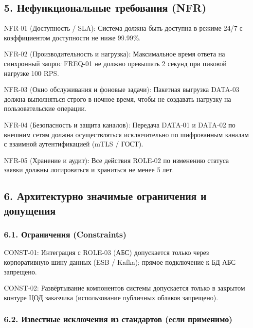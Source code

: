\documentclass[10pt,a4paper]{article}
\begin{document}
\subsection{5. Нефункциональные требования (NFR)}\label{5-ux43dux435ux444ux443ux43dux43aux446ux438ux43eux43dux430ux43bux44cux43dux44bux435-ux442ux440ux435ux431ux43eux432ux430ux43dux438ux44f-nfr}

NFR-01 (Доступность / SLA): Система должна быть доступна в режиме 24/7 с коэффициентом доступности не ниже 99.99\%.

NFR-02 (Производительность и нагрузка): Максимальное время ответа на синхронный запрос FREQ-01 не должно превышать 2 секунд при пиковой нагрузке 100 RPS.

NFR-03 (Окно обслуживания и фоновые задачи): Пакетная выгрузка DATA-03 должна выполняться строго в ночное время, чтобы не создавать нагрузку на пользовательские операции.

NFR-04 (Безопасность и защита каналов): Передача DATA-01 и DATA-02 по внешним сетям должна осуществляться исключительно по шифрованным каналам с взаимной аутентификацией (mTLS / ГОСТ).

NFR-05 (Хранение и аудит): Все действия ROLE-02 по изменению статуса заявки должны логироваться и храниться не менее 5 лет.

\subsection{6. Архитектурно значимые ограничения и допущения}\label{6-ux430ux440ux445ux438ux442ux435ux43aux442ux443ux440ux43dux43e-ux437ux43dux430ux447ux438ux43cux44bux435-ux43eux433ux440ux430ux43dux438ux447ux435ux43dux438ux44f-ux438-ux434ux43eux43fux443ux449ux435ux43dux438ux44f}

\subsubsection{6.1. Ограничения (Constraints)}\label{61-ux43eux433ux440ux430ux43dux438ux447ux435ux43dux438ux44f-constraints}

CONST-01: Интеграция с ROLE-03 (АБС) допускается только через корпоративную шину данных (ESB / Kafka); прямое подключение к БД АБС запрещено.

CONST-02: Развёртывание компонентов системы допускается только в закрытом контуре ЦОД заказчика (использование публичных облаков запрещено).

\subsubsection{6.2. Известные исключения из стандартов (если применимо)}\label{62-ux438ux437ux432ux435ux441ux442ux43dux44bux435-ux438ux441ux43aux43bux44eux447ux435ux43dux438ux44f-ux438ux437-ux441ux442ux430ux43dux434ux430ux440ux442ux43eux432-ux435ux441ux43bux438-ux43fux440ux438ux43cux435ux43dux438ux43cux43e}
\end{document}
